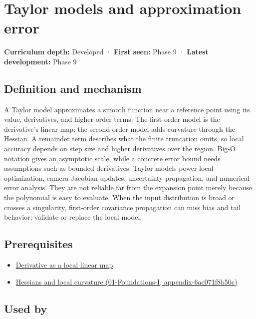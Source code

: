 \hypertarget{appendix-32f39e9a3738}{}
\section{Taylor models and approximation error}\label{appendix-32f39e9a3738-taylor-models-and-approximation-error}

\textbf{Curriculum depth:} Developed · \textbf{First seen:} Phase 9 · \textbf{Latest development:} Phase 9

\subsection{Definition and mechanism}\label{appendix-32f39e9a3738-definition-and-mechanism}

A Taylor model approximates a smooth function near a reference point using its value, derivatives, and higher-order terms. The first-order model is the derivative's linear map; the second-order model adds curvature through the Hessian. A remainder term describes what the finite truncation omits, so local accuracy depends on step size and higher derivatives over the region. Big-O notation gives an asymptotic scale, while a concrete error bound needs assumptions such as bounded derivatives. Taylor models power local optimization, camera Jacobian updates, uncertainty propagation, and numerical error analysis. They are not reliable far from the expansion point merely because the polynomial is easy to evaluate. When the input distribution is broad or crosses a singularity, first-order covariance propagation can miss bias and tail behavior; validate or replace the local model.

\subsection{Prerequisites}\label{appendix-32f39e9a3738-prerequisites}

\begin{itemize}
\tightlist
\item
  \hyperref[appendix-7bc181935c42]{Derivative as a local linear map}
\item
  \href{../01-Foundations-I/main.pdf\#nameddest=appendix-6ac071f8b50c}{Hessians and local curvature (01-Foundations-I, appendix-6ac071f8b50c)}
\end{itemize}

\subsection{Used by}\label{appendix-32f39e9a3738-used-by}

